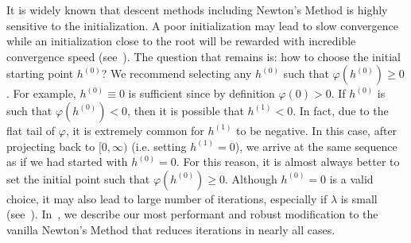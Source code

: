 It is widely known that descent methods including Newton's Method
is highly sensitive to the initialization.
A poor initialization may lead to slow convergence
while an initialization close to the root will be rewarded with incredible convergence speed
(see~).
The question that remains is: how to choose the initial starting point $h^{(0)}$?
We recommend selecting any $h^{(0)}$ such that $\varphi(h^{(0)}) \geq 0$.
For example, $h^{(0)} \equiv 0$ is sufficient since by definition $\varphi(0) > 0$.
If $h^{(0)}$ is such that $\varphi(h^{(0)}) < 0$,
then it is possible that $h^{(1)} < 0$.
In fact, due to the flat tail of $\varphi$, it is extremely common for $h^{(1)}$ to be negative.
In this case, after projecting back to $[0, \infty)$ (i.e. setting $h^{(1)} = 0$),
we arrive at the same sequence as if we had started with $h^{(0)} = 0$.
For this reason, it is almost always better to 
set the initial point such that $\varphi(h^{(0)}) \geq 0$.
Although $h^{(0)} = 0$ is a valid choice, it may also lead to large number of iterations,
especially if $\lambda$ is small
(see~).
In~, we describe our most performant and robust 
modification to the vanilla Newton's Method that reduces iterations in nearly all cases.
